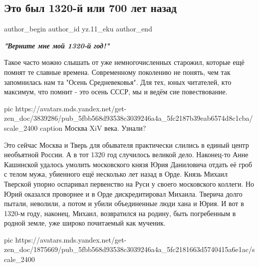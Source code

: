  
 
 
 
 
 
\subsection{Это был 1320-й или 700 лет назад}
\label{sec:02_12_2020.sites.ru.zen_yandex.yz.11_eku.1.1320_700_let_nazad}
\ifcmt
  author_begin
   author_id yz.11_eku
  author_end
\fi

\begin{leftbar}
  \begingroup
    \em\Large\bfseries\color{blue}
"Верните мне мой 1320-й год!"
  \endgroup
\end{leftbar}

Такое часто можно слышать от уже немногочисленных старожил, которые ещё помнят
те славные времена. Современному поколению не понять, чем так запомнилась нам
та "Осень Средневековья". Для тех, юных читателей, кто максимум, что помнит -
это осень СССР, мы и ведём сие повествование.

\ifcmt
pic https://avatars.mds.yandex.net/get-zen_doc/3839286/pub_5fbb568d93538c3039246a4a_5fc2187b39eab6574d8c1cba/scale_2400
caption Москва XiV века. Узнали?
\fi

Это сейчас Москва и Тверь для обывателя практически слились в единый центр
необъятной России. А в тот 1320 год случилось великой дело. Наконец-то Анне
Кашинской удалось умолить московского князя Юрия Даниловича отдать её гроб с
телом мужа, убиенного ещё несколько лет назад в Орде. Князь Михаил Тверской
упорно оспаривал первенство на Руси у своего московского коллеги. Но Юрий
оказался проворнее и в Орде дискредитировал Михаила. Тверича долго пытали,
неволили, а потом и убили объединенные люди хана и Юрия. И вот в 1320-м году,
наконец, Михаил, возвратился на родину, быть погребенным в родной земле, уже
широко почитаемый как мученик. 

\ifcmt
pic https://avatars.mds.yandex.net/get-zen_doc/1875669/pub_5fbb568d93538c3039246a4a_5fc2181663d5740415a6e1ac/scale_2400
\fi

